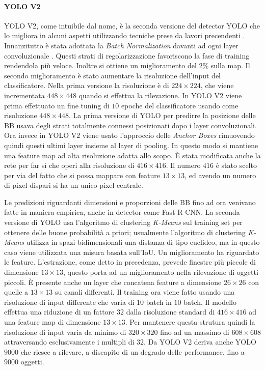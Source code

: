 \paragraph{YOLO V2}
\ac{YOLO} V2, come intuibile dal nome, è la seconda versione del detector \ac{YOLO} che lo migliora in alcuni aspetti utilizzando tecniche prese da lavori precendenti \cite{redmon2017yolo9000}.
Innanzitutto è stata adottata la \textit{Batch Normalization} davanti ad ogni layer convoluzionale \cite{ioffe2015batch}. Questi strati di regolarizzazione favoriscono la fase 
di training rendendola più veloce. Inoltre si ottiene un miglioramento del $2\%$ sulla \ac{map}.
Il secondo miglioramento è stato aumentare la risoluzione dell'input del classificatore. Nella prima versione la risoluzione è di $224 \times 224$, che viene incrementata $448 \times 448$ quando si effettua la rilevazione.
In \ac{YOLO} V2 viene prima effettuato un fine tuning di $10$ epoche del classificatore usando come risoluzione $448 \times 448$.
La prima versione di \ac{YOLO} per predirre la posizione delle \ac{BB} usava degli strati totalmente connessi posizionati dopo i layer convoluzionali. Ora invece in \ac{YOLO} V2 viene usato l'approccio delle \textit{Anchor Boxes} rimuovendo quindi questi ultimi layer insieme al layer di pooling. 
In questo modo si mantiene una feature map ad alta risoluzione adatta allo scopo. È stata modificata anche la rete per far sì che operi alla risoluzione di $416 \times 416$. Il numero $416$ è stato scelto per via del fatto che si possa mappare con feature $13 \times 13$, ed avendo un numero di pixel dispari si ha un unico pixel centrale. 

Le predizioni riguardanti dimensioni e proporzioni delle \ac{BB} fino ad ora venivano fatte in maniera empirica, anche in detector come Fast R-CNN. La seconda versione di \ac{YOLO} usa l'algoritmo di clustering \textit{K-Means} sul training set per ottenere delle buone probabilità a priori; usualmente l'algoritmo di clustering \textit{K-Means} utilizza in spazi bidimensionali una distanza di tipo euclideo, ma in questo caso viene utilizzata una misura basata sull'\ac{IoU}. 
Un miglioramento ha riguardato le feature. L'estrazione, come detto in precedenza, prevede finestre più piccole di dimensione $13 \times 13$, questo porta ad un miglioramento nella rilevazione di oggetti piccoli. È presente anche un layer che concatena feature a dimensione $26 \times 26$ con quelle a $13 \times 13$ su canali differenti. 
Il training ora viene fatto usando una risoluzione di input differente che varia di $10$ batch in $10$ batch. Il modello effettua una riduzione di un fattore $32$ dalla risoluzione standard di $416 \times 416$ ad una feature map di dimensione $13 \times 13$. Per mantenere questa strutura quindi la risoluzione di input varia da minimo di $320 \times 320$ fino ad un massimo di $608 \times 608$ attraversando esclusivamente i multipli di $32$. Da \ac{YOLO} V2 deriva anche \ac{YOLO} $9000$ che riesce a rilevare, a discapito di un degrado delle performance, fino a $9000$ oggetti.

